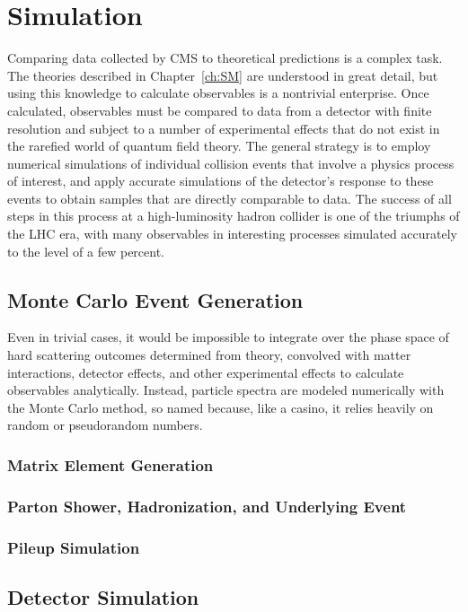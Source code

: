 
\chapter{Simulation}\label{ch:simulation}

Comparing data collected by CMS to theoretical predictions is a complex task.
The theories described in Chapter~\ref{ch:SM} are understood in great detail, but using this knowledge to calculate observables is a nontrivial enterprise.
Once calculated, observables must be compared to data from a detector with finite resolution and subject to a number of experimental effects that do not exist in the rarefied world of quantum field theory.
The general strategy is to employ numerical simulations of individual collision events that involve a physics process of interest, and apply accurate simulations of the detector's response to these events to obtain samples that are directly comparable to data.
The success of all steps in this process at a high-luminosity hadron collider is one of the triumphs of the LHC era, with many observables in interesting processes simulated accurately to the level of a few percent.



\section{Monte Carlo Event Generation}

Even in trivial cases, it would be impossible to integrate over the phase space of hard scattering outcomes determined from theory, convolved with matter interactions, detector effects, and other experimental effects to calculate observables analytically.
Instead, particle spectra are modeled numerically with the Monte Carlo method, so named because, like a casino, it relies heavily on random or pseudorandom numbers. 



\subsection{Matrix Element Generation}



\subsection{Parton Shower, Hadronization, and Underlying Event}\label{sec:partonShower}



\subsection{Pileup Simulation}




\section{Detector Simulation}
